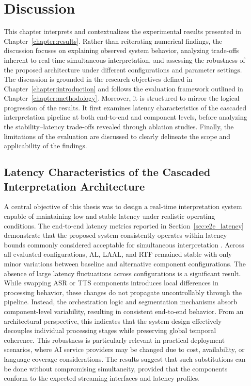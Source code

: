\chapter{Discussion}
\label{chapter:discussion}

This chapter interprets and contextualizes the experimental results presented in Chapter~\ref{chapter:results}. Rather than reiterating numerical findings, the discussion focuses on explaining observed system behavior, analyzing trade-offs inherent to real-time simultaneous interpretation, and assessing the robustness of the proposed architecture under different configurations and parameter settings. The discussion is grounded in the research objectives defined in Chapter~\ref{chapter:introduction} and follows the evaluation framework outlined in Chapter~\ref{chapter:methodology}. Moreover, it is structured to mirror the logical progression of the results. It first examines latency characteristics of the cascaded interpretation pipeline at both end-to-end and component levels, before analyzing the stability--latency trade-offs revealed through ablation studies. Finally, the limitations of the evaluation are discussed to clearly delineate the scope and applicability of the findings.

\section{Latency Characteristics of the Cascaded Interpretation Architecture}

A central objective of this thesis was to design a real-time interpretation system capable of maintaining low and stable latency under realistic operating conditions. The end-to-end latency metrics reported in Section~\ref{sec:e2e_latency} demonstrate that the proposed system consistently operates within latency bounds commonly considered acceptable for simultaneous interpretation \cite{ ma2019staclarxiv, fantinuoli2023defining}. Across all evaluated configurations, AL, LAAL, and RTF remained stable with only minor variations between baseline and alternative component configurations. The absence of large latency fluctuations across configurations is a significant result. While swapping ASR or TTS components introduces local differences in processing behavior, these changes do not propagate uncontrollably through the pipeline. Instead, the orchestration logic and segmentation mechanisms absorb component-level variability, resulting in consistent end-to-end behavior. From an architectural perspective, this indicates that the system design effectively decouples individual processing stages while preserving global temporal coherence. This robustness is particularly relevant in practical deployment scenarios, where AI service providers may be changed due to cost, availability, or language coverage considerations. The results suggest that such substitutions can be done without compromising simultaneity, provided that the components conform to the expected streaming interfaces and latency profiles.

